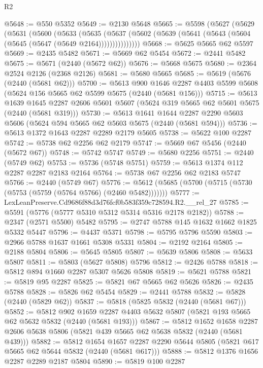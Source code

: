 \begin{lexlean}{R2}
\begin{coremodule}
@5648 := @550 @5352
@5649 := @2130 @5648
@5665 := @5598
    (@5627
      (@5629
        (@5631
          (@5600
            (@5633
              (@5635
                (@5637 (@5602 (@5639 (@5641 (@5643 (@5604 (@5645 (@5647 (@5649 @2164)))))))))))))))
@5668 := @5625 @5665 @62 @5597
@5669 := @2435 @5482
@5671 := @5669 @62 @5454
@5672 := @2441 @5482
@5675 := @5671 (@2440 (@5672 @62))
@5676 := @5668 @5675
@5680 := @2364 @2524 @2126 (@2368 @2126)
@5681 := @5680 @5665
@5685 := @5619 (@5676 (@2440 (@5681 @62)))
@5700 := @5613
    @900
    @1646
    @2287
    @4403
    @5599
    @5608
    (@5624 @156 @5665 @62 @5599 @5675 (@2440 (@5681 @156)))
@5715 := @5613
    @1639
    @1645
    @2287
    @2606
    @5601
    @5607
    (@5624 @319 @5665 @62 @5601 @5675 (@2440 (@5681 @319)))
@5730 := @5613
    @1641
    @1644
    @2287
    @2290
    @5603
    @5606
    (@5624 @594 @5665 @62 @5603 @5675 (@2440 (@5681 @594)))
@5736 := @5613 @1372 @1643 @2287 @2289 @2179 @5605
@5738 := @5622 @100 @2287
@5742 := @5738 @62 @2256 @62 @2179
@5747 := @5669 @67 @5456 (@2440 (@5672 @67))
@5748 := @5742 @5747
@5749 := @5680 @2256
@5751 := @2440 (@5749 @62)
@5753 := @5736 (@5748 @5751)
@5759 := @5613 @1374 @112 @2287 @2287 @2183 @2164
@5764 := @5738 @67 @2256 @62 @2183 @5747
@5766 := @2440 (@5749 @67)
@5776 := @5612 (@5685 (@5700 (@5715 (@5730 (@5753 (@5759 (@5764 @5766) (@2460 @5482)))))))
@5777 := LexLeanPreserve.Cd9686f88d3d76fcf0b583f359c728594.R2.__rel_27
@5785 := @5591 (@5776 (@5777 @5310 @5312 @5314 @5316 @2178 @2182))
@5788 := @2347 (@2571 @5500) @5482
@5795 := @2747 @5788 @145 @1632 @1662 @1825 @5332 @5447
@5796 := @4437 @5371
@5798 := @5795 @5796 @5590
@5803 := @2966 @5788 @1637 @1661 @5308 @5331
@5804 := @2192 @2164
@5805 := @2188 @5804
@5806 := @5645 @5805
@5807 := @5639 @5806
@5808 := @5633 @5807
@5811 := @5803 (@5627 @5808) @5796
@5812 := @2426 @5788
@5818 := @5812 @894 @1660 @2287 @5307 @5626 @5808
@5819 := @5621 @5788
@5821 := @5819 @95 @2287
@5825 := @5821 @67 @5665 @62 @5626
@5826 := @2435 @5788
@5828 := @5826 @62 @5454
@5829 := @2441 @5788
@5832 := @5828 (@2440 (@5829 @62))
@5837 := @5818 (@5825 @5832 (@2440 (@5681 @67)))
@5852 := @5812
    @902
    @1659
    @2287
    @4403
    @5632
    @5807
    (@5821 @193 @5665 @62 @5632 @5832 (@2440 (@5681 @193)))
@5867 := @5812
    @1652
    @1658
    @2287
    @2606
    @5638
    @5806
    (@5821 @439 @5665 @62 @5638 @5832 (@2440 (@5681 @439)))
@5882 := @5812
    @1654
    @1657
    @2287
    @2290
    @5644
    @5805
    (@5821 @617 @5665 @62 @5644 @5832 (@2440 (@5681 @617)))
@5888 := @5812 @1376 @1656 @2287 @2289 @2187 @5804
@5890 := @5819 @100 @2287

\end{coremodule}
\end{lexlean}
